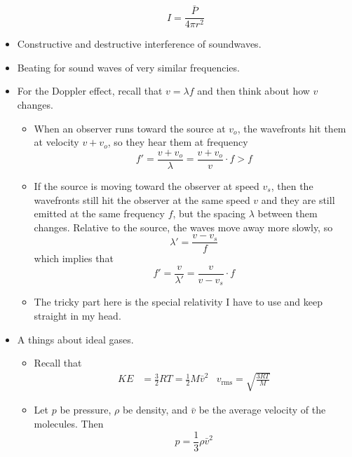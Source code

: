 \documentclass[../notes.tex]{subfiles}
\begin{document}
\begin{itemize}
    \begin{equation*}
        I = \frac{\bar{P}}{4\pi r^2}
    \end{equation*}
    \item Constructive and destructive interference of soundwaves.
    \item Beating for sound waves of very similar frequencies.
    \item For the Doppler effect, recall that $v=\lambda f$ and then think about how $v$ changes.
    \begin{itemize}
        \item When an observer runs toward the source at $v_o$, the wavefronts hit them at velocity $v+v_o$, so they hear them at frequency
        \begin{equation*}
            f' = \frac{v+v_o}{\lambda}
            = \frac{v+v_o}{v}\cdot f
            > f
        \end{equation*}
        \item If the source is moving toward the observer at speed $v_s$, then the wavefronts still hit the observer at the same speed $v$ and they are still emitted at the same frequency $f$, but the spacing $\lambda$ between them changes. Relative to the source, the waves move away more slowly, so
        \begin{equation*}
            \lambda' = \frac{v-v_s}{f}
        \end{equation*}
        which implies that
        \begin{equation*}
            f' = \frac{v}{\lambda'}
            = \frac{v}{v-v_s}\cdot f
        \end{equation*}
        \item The tricky part here is the special relativity I have to use and keep straight in my head.
    \end{itemize}
    \item A things about ideal gases.
    \begin{itemize}
        \item Recall that
        \begin{align*}
            KE &= \frac{3}{2}RT = \frac{1}{2}M\bar{v}^2&
            v_\text{rms} = \sqrt{\frac{3RT}{M}}
        \end{align*}
        \item Let $p$ be pressure, $\rho$ be density, and $\bar{v}$ be the average velocity of the molecules. Then
        \begin{equation*}
            p = \frac{1}{3}\rho\bar{v}^2

\end{equation*}
\end{itemize}
\end{itemize}
\end{document}
